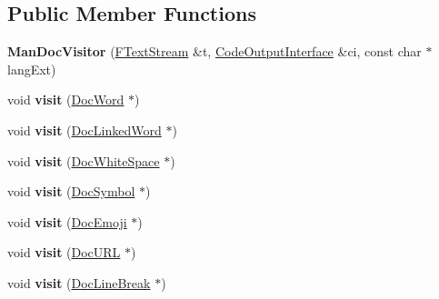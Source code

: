 \subsection*{Public Member Functions}
\begin{DoxyCompactItemize}
\item 
\mbox{\label{class_man_doc_visitor_a2cde7798dbf5b935ea19a24143592691}} 
{\bfseries Man\+Doc\+Visitor} (\mbox{\hyperlink{class_f_text_stream}{F\+Text\+Stream}} \&t, \mbox{\hyperlink{class_code_output_interface}{Code\+Output\+Interface}} \&ci, const char $\ast$lang\+Ext)
\item 
\mbox{\label{class_man_doc_visitor_a78d86f216cde7db35913c83f439aee47}} 
void {\bfseries visit} (\mbox{\hyperlink{class_doc_word}{Doc\+Word}} $\ast$)
\item 
\mbox{\label{class_man_doc_visitor_a976144c66fb2b63504ea913910a7a7f0}} 
void {\bfseries visit} (\mbox{\hyperlink{class_doc_linked_word}{Doc\+Linked\+Word}} $\ast$)
\item 
\mbox{\label{class_man_doc_visitor_ac3fa7a7d15c49edbb330fb204672c4ca}} 
void {\bfseries visit} (\mbox{\hyperlink{class_doc_white_space}{Doc\+White\+Space}} $\ast$)
\item 
\mbox{\label{class_man_doc_visitor_a3e5b70fdc47f9a0f7853309dc81f5a2f}} 
void {\bfseries visit} (\mbox{\hyperlink{class_doc_symbol}{Doc\+Symbol}} $\ast$)
\item 
\mbox{\label{class_man_doc_visitor_a2524949180e8c04fb63f14d8f0df684d}} 
void {\bfseries visit} (\mbox{\hyperlink{class_doc_emoji}{Doc\+Emoji}} $\ast$)
\item 
\mbox{\label{class_man_doc_visitor_a9a7b6956a8ac6c89ee141368991c1819}} 
void {\bfseries visit} (\mbox{\hyperlink{class_doc_u_r_l}{Doc\+U\+RL}} $\ast$)
\item 
\mbox{\label{class_man_doc_visitor_ad381c88ef578c667010b0371dcdf63f2}} 
void {\bfseries visit} (\mbox{\hyperlink{class_doc_line_break}{Doc\+Line\+Break}} $\ast$)
\item 

\end{DoxyCompactItemize}
